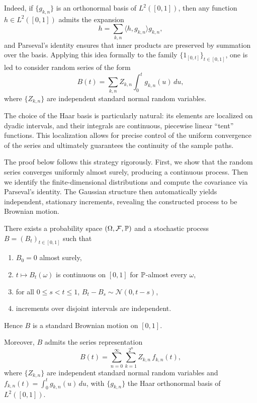 Indeed, if $\{g_{k,n}\}$ is an orthonormal basis of $L^2([0,1])$, then any function
$h \in L^2([0,1])$ admits the expansion
\[
h = \sum_{k,n} \langle h, g_{k,n} \rangle g_{k,n},
\]
and Parseval's identity ensures that inner products are preserved by summation over the
basis. Applying this idea formally to the family $\{1_{[0,t]}\}_{t\in[0,1]}$, one is led
to consider random series of the form
\[
B(t) = \sum_{k,n} Z_{k,n} \int_0^t g_{k,n}(u)\,du,
\]
where $\{Z_{k,n}\}$ are independent standard normal random variables.

The choice of the Haar basis is particularly natural: its elements are localized on
dyadic intervals, and their integrals are continuous, piecewise linear ``tent''
functions. This localization allows for precise control of the uniform convergence of
the series and ultimately guarantees the continuity of the sample paths.

The proof below follows this strategy rigorously. First, we show that the random series
converges uniformly almost surely, producing a continuous process. Then we identify the
finite-dimensional distributions and compute the covariance via Parseval's identity.
The Gaussian structure then automatically yields independent, stationary increments,
revealing the constructed process to be Brownian motion.

\begin{theorem}
There exists a probability space $(\Omega,\mathcal F,\mathbb{P})$ and a stochastic process
$B=(B_t)_{t\in[0,1]}$ such that

\begin{enumerate}
\item $B_0=0$ almost surely,
\item $t\mapsto B_t(\omega)$ is continuous on $[0,1]$ for $\mathbb{P}$-almost every $\omega$,
\item for all $0\le s<t\le 1$, $B_t-B_s\sim\mathcal N(0,t-s)$,
\item increments over disjoint intervals are independent.
\end{enumerate}

Hence $B$ is a standard Brownian motion on $[0,1]$.

Moreover, $B$ admits the series representation
\[
B(t)=\sum_{n=0}^\infty\sum_{k=1}^{2^n} Z_{k,n}\, f_{k,n}(t),
\]
where $\{Z_{k,n}\}$ are independent standard normal random variables and
$f_{k,n}(t)=\int_0^t g_{k,n}(u)\,du$, with $\{g_{k,n}\}$ the Haar orthonormal basis of
$L^2([0,1])$.
\end{theorem}

